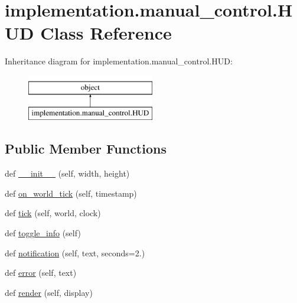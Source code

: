 \hypertarget{classimplementation_1_1manual__control_1_1_h_u_d}{}\section{implementation.\+manual\+\_\+control.\+H\+UD Class Reference}
\label{classimplementation_1_1manual__control_1_1_h_u_d}
Inheritance diagram for implementation.\+manual\+\_\+control.\+H\+UD\+:\begin{figure}[H]
\begin{center}
\leavevmode
\includegraphics[height=2.000000cm]{classimplementation_1_1manual__control_1_1_h_u_d}
\end{center}
\end{figure}
\subsection*{Public Member Functions}
\begin{DoxyCompactItemize}
\item 
def \hyperlink{classimplementation_1_1manual__control_1_1_h_u_d_a0cfbc7b3d4bd4442e0ded8bb75d5cc93}{\+\_\+\+\_\+init\+\_\+\+\_\+} (self, width, height)
\item 
def \hyperlink{classimplementation_1_1manual__control_1_1_h_u_d_a47c1ee42156cddbb581135dcd38c13a0}{on\+\_\+world\+\_\+tick} (self, timestamp)
\item 
def \hyperlink{classimplementation_1_1manual__control_1_1_h_u_d_a07f4da3ec0a20a6f90fcf9c7a34791b4}{tick} (self, world, clock)
\item 
def \hyperlink{classimplementation_1_1manual__control_1_1_h_u_d_a68d0dce74e4dbdd46737fd6b202df6e2}{toggle\+\_\+info} (self)
\item 
def \hyperlink{classimplementation_1_1manual__control_1_1_h_u_d_ab7dc7fd919aed4a08ae3051964fc823d}{notification} (self, text, seconds=2.)
\item 
def \hyperlink{classimplementation_1_1manual__control_1_1_h_u_d_a54880fbc86435b853cf91cd551db8f52}{error} (self, text)
\item 
def \hyperlink{classimplementation_1_1manual__control_1_1_h_u_d_a8fbc629658fa677fd78f966648e5f1b5}{render} (self, display)
\end{DoxyCompactItemize}
